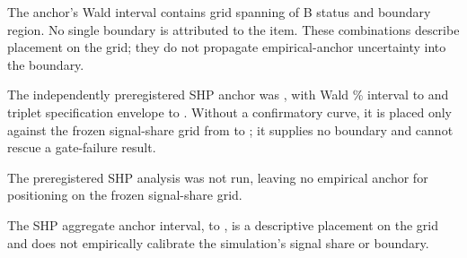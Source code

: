 The anchor's Wald interval contains  grid  spanning   of B status and boundary region. No single boundary is attributed to the item. %
These combinations describe placement on the grid; they do not propagate empirical-anchor uncertainty into the boundary. %

The independently preregistered SHP anchor was , with Wald \% interval  to  and triplet specification envelope  to . %
Without a confirmatory curve, it is placed only against the frozen signal-share grid from  to ; it supplies no boundary and cannot rescue a gate-failure result. %

The preregistered SHP analysis was not run, leaving no empirical anchor for positioning on the frozen signal-share grid. %

The SHP aggregate anchor interval,  to , is a descriptive placement on the grid and does not empirically calibrate the simulation's signal share or boundary. %

